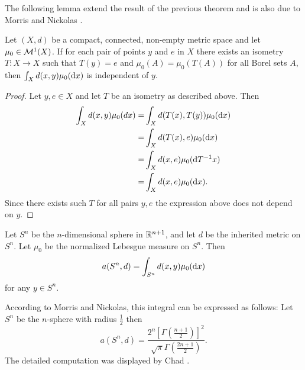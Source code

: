 The following lemma extend the result of the previous theorem and is also due to Morris and Nickolas \cite{Morris1983}.
\begin{lemma}
	Let $(X,d)$ be a compact, connected, non-empty %
	 metric space and let $\mu_0\in \mathcal{M}^1(X)$. If for each pair of points $y$ and $e$ in $X$ there exists an isometry $T: X\to X$ such that $T(y)=e$ and $\mu_0(A)=\mu_0(T(A))$ for all Borel sets $A$, then $\int_Xd(x,y)\mu_0(\mathrm{d}x)$ is independent of $y$.
\end{lemma}
\begin{proof}
	Let $y,e\in X$ and let $T$ be an isometry as described above. Then
	\begin{align*}
		\int_X d(x,y)\mu_0(dx)=&\int_X d(T(x),T(y))\mu_0(\mathrm{d}x)
		\\
		=&\int_Xd(T(x),e)\mu_0(\mathrm{d}x)
		\\
		=&\int_Xd(x,e)\mu_0(\mathrm{d}T^{-1}x)
		\\
		=&\int_Xd(x,e)\mu_0(\mathrm{d}x).
	\end{align*}
	Since there exists such $T$ for all pairs $y,e$ the expression above does not depend on $y$.
\end{proof}



\begin{corollary}
	Let $S^n$ be the $n$-dimensional sphere in $\mathbb{R}^{n+1}$, and let $d$ be the inherited metric on $S^n$. Let $\mu_0$ be the normalized Lebesgue measure on $S^n$. Then
	\[
	a(S^n,d)=\int_{S^n}d(x,y)\mu_0(\mathrm{d}x)
	\]
	for any $y\in S^n$.
\end{corollary}

According to Morris and Nickolas, this integral can be expressed as follows: Let $S^n$ be the $n$-sphere with radius $\frac{1}{2}$ then
\[
a(S^n,d)=\frac{2^n\left[\Gamma\left(\frac{n+1}{2}\right)\right]^2}{\sqrt{\pi}\Gamma\left(\frac{2n+1}{2}\right)}.
\]
The detailed computation was displayed by Chad \cite{chad}.
